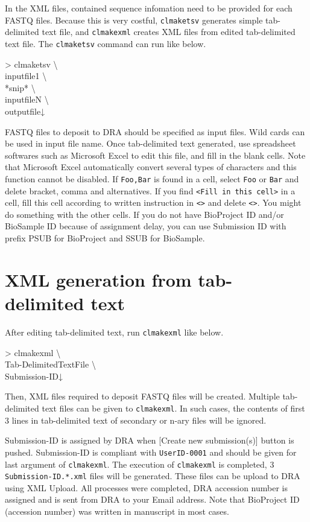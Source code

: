 \documentclass[titlepage,10pt,a4paper,english]{jsbook}
\newenvironment{cmd}{\begin{oframed}\raggedright\ttfamily\footnotesize\setlength{\baselineskip}{1.4em}}{\end{oframed}\vspace{-1em}}
\begin{document}
In the XML files, contained sequence infomation need to be provided for each FASTQ files.
Because this is very costful, \texttt{clmaketsv} generates simple tab-delimited text file, and \texttt{clmakexml} creates XML files from edited tab-delimited text file.
The \texttt{clmaketsv} command can run like below.
\begin{cmd}
{\textgreater} clmaketsv {\textbackslash}\\
inputfile1 {\textbackslash}\\
*snip* {\textbackslash}\\
inputfileN {\textbackslash}\\
outputfile↓
\end{cmd}
FASTQ files to deposit to DRA should be specified as input files.
Wild cards can be used in input file name.
Once tab-delimited text generated, use spreadsheet softwares such as Microsoft Excel to edit this file, and fill in the blank cells.
Note that Microsoft Excel automatically convert several types of characters and this function cannot be disabled.
If \texttt{{\lbrack}Foo,Bar{\rbrack}} is found in a cell, select \texttt{Foo} or \texttt{Bar} and delete bracket, comma and alternatives.
If you find \texttt{{\textless}Fill in this cell{\textgreater}} in a cell, fill this cell according to written instruction in \texttt{{\textless}{\textgreater}} and delete \texttt{{\textless}{\textgreater}}.
You might do something with the other cells.
If you do not have BioProject ID and/or BioSample ID because of assignment delay, you can use Submission ID with prefix PSUB for BioProject and SSUB for BioSample.

\section{XML generation from tab-delimited text}

After editing tab-delimited text, run \texttt{clmakexml} like below.
\begin{cmd}
{\textgreater} clmakexml {\textbackslash}\\
Tab-DelimitedTextFile {\textbackslash}\\
Submission-ID↓
\end{cmd}
Then, XML files required to deposit FASTQ files will be created.
Multiple tab-delimited text files can be given to \texttt{clmakexml}.
In such cases, the contents of first 3 lines in tab-delimited text of secondary or n-ary files will be ignored.

Submission-ID is assigned by DRA when [Create new submission(s)] button is pushed.
Submission-ID is compliant with \texttt{UserID-0001} and should be given for last argument of \texttt{clmakexml}.
The execution of \texttt{clmakexml} is completed, 3 \texttt{Submission-ID.*.xml} files will be generated.
These files can be upload to DRA using XML Upload.
All processes were completed, DRA accession number is assigned and is sent from DRA to your Email address.
Note that BioProject ID (accession number) was written in manuscript in most cases.
\end{document}
